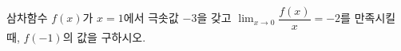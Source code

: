 삼차함수 $f(x)$가 $x=1$에서 극솟값 $-3$을 갖고 $\displaystyle\lim_{x\to 0}\dfrac{f(x)}{x}=-2$를 만족시킬 때, $f(-1)$의 값을 구하시오.
